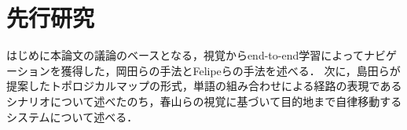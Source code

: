 \chapter{先行研究}
\label{chap:prior}
はじめに本論文の議論のベースとなる，視覚からend-to-end学習によってナビゲーションを獲得した，岡田らの手法とFelipeらの手法を述べる．
次に，島田らが提案したトポロジカルマップの形式，単語の組み合わせによる経路の表現であるシナリオについて述べたのち，春山らの視覚に基づいて目的地まで自律移動するシステムについて述べる．

\clearpage



\clearpage


